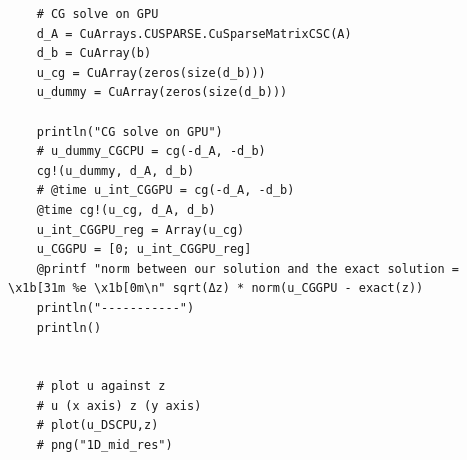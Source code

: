 \documentclass[11pt]{article}
\begin{document}
\begin{verbatim}
    # CG solve on GPU
    d_A = CuArrays.CUSPARSE.CuSparseMatrixCSC(A)
    d_b = CuArray(b)
    u_cg = CuArray(zeros(size(d_b)))
    u_dummy = CuArray(zeros(size(d_b)))

    println("CG solve on GPU")
    # u_dummy_CGCPU = cg(-d_A, -d_b)
    cg!(u_dummy, d_A, d_b)
    # @time u_int_CGGPU = cg(-d_A, -d_b)
    @time cg!(u_cg, d_A, d_b)
    u_int_CGGPU_reg = Array(u_cg)
    u_CGGPU = [0; u_int_CGGPU_reg]
    @printf "norm between our solution and the exact solution = \x1b[31m %e \x1b[0m\n" sqrt(Δz) * norm(u_CGGPU - exact(z))
    println("-----------")
    println()


    # plot u against z
    # u (x axis) z (y axis)
    # plot(u_DSCPU,z)
    # png("1D_mid_res")

	\end{verbatim}
\end{document}
